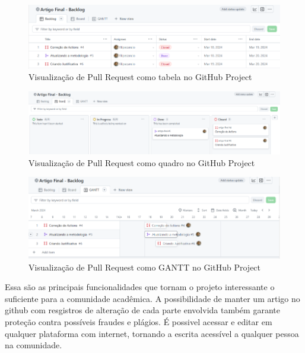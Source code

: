 \begin{figure}[ht]
	\centering
	\includegraphics[width=.6\textwidth]{./images/fig07.png}
	\caption{Visualização de Pull Request como tabela no GitHub Project}
	\label{fig:fig07}
\end{figure}

\begin{figure}[ht]
	\centering
	\includegraphics[width=.6\textwidth]{./images/fig08.png}
	\caption{Visualização de Pull Request como quadro no GitHub Project}
	\label{fig:fig08}
\end{figure}

\begin{figure}[ht]
	\centering
	\includegraphics[width=.6\textwidth]{./images/fig09.png}
	\caption{Visualização de Pull Request como GANTT no GitHub Project}
	\label{fig:fig09}
\end{figure}

Essa são as principais funcionalidades que tornam o projeto interessante o suficiente para a comunidade acadêmica. A possibilidade de manter um artigo no github com resgistros de alteração de cada parte envolvida também garante proteção contra possíveis fraudes e plágios. É possivel acessar e editar em qualquer plataforma com internet, tornando a escrita acessível a qualquer pessoa na comunidade.
